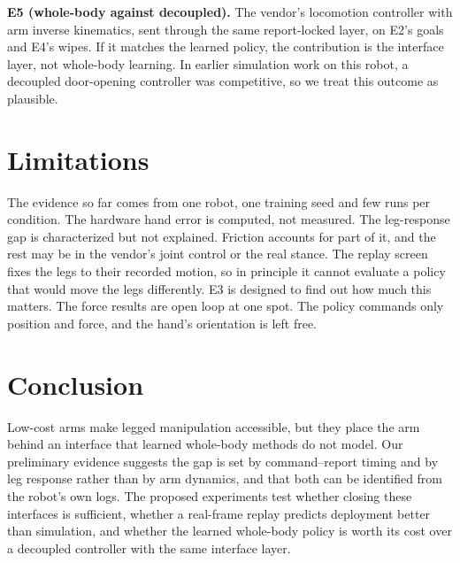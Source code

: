 \documentclass[conference]{IEEEtran}
\begin{document}
\textbf{E5 (whole-body against decoupled).} The vendor's locomotion controller with arm inverse kinematics, sent through
the same report-locked layer, on E2's goals and E4's wipes. If it matches the learned policy, the contribution is the
interface layer, not whole-body learning. In earlier simulation work on this robot, a decoupled door-opening controller
was competitive, so we treat this outcome as plausible.

\section{Limitations}

The evidence so far comes from one robot, one training seed and few runs per condition. The hardware hand error is
computed, not measured. The leg-response gap is characterized but not explained. Friction accounts for part of it, and
the rest may be in the vendor's joint control or the real stance. The replay screen fixes the legs to their recorded
motion, so in principle it cannot evaluate a policy that would move the legs differently. E3 is designed to find out how
much this matters. The force results are open loop at one spot. The policy commands only position and force, and the
hand's orientation is left free.

\section{Conclusion}

Low-cost arms make legged manipulation accessible, but they place the arm behind an interface that learned whole-body
methods do not model. Our preliminary evidence suggests the gap is set by command--report timing and by leg response
rather than by arm dynamics, and that both can be identified from the robot's own logs. The proposed experiments test
whether closing these interfaces is sufficient, whether a real-frame replay predicts deployment better than simulation,
and whether the learned whole-body policy is worth its cost over a decoupled controller with the same interface layer.



\end{document}
